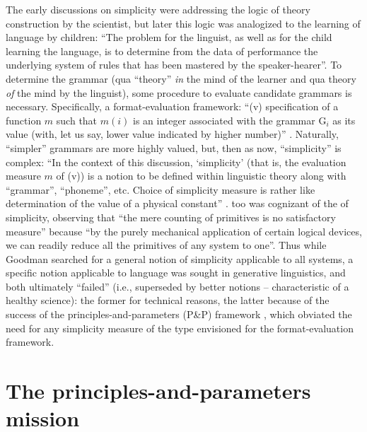 \documentclass[output=paper]{langsci/langscibook}
\begin{document}
The early discussions on simplicity were addressing the logic of theory
construction by the scientist, but later \citep[4]{Chomsky1965} this logic was
analogized to the learning of language by children: “The problem for the
linguist, as well as for the child learning the language, is to determine from
the data of performance the underlying system of rules that has been mastered
by the speaker-hearer”. To determine the grammar (qua “theory” \emph{in} the
mind of the learner and qua theory \emph{of} the mind by the linguist), some
procedure to evaluate candidate grammars is necessary. Specifically, a
format-evaluation framework: “(v) specification of a function $m$ such
that $m(i)$ is an integer associated with the grammar
$\text{G}_i$ as its value (with, let us say, lower value indicated
by higher number)” \parencite[31]{Chomsky1965}. Naturally, “simpler” grammars are more
highly valued, but, then as now, “simplicity” is complex: “In the context of
this discussion, ‘simplicity’ (that is, the evaluation measure $m$ of (v))
is a notion to be defined within linguistic theory along with \enquote{grammar},
\enquote{phoneme}, etc. Choice of simplicity measure is rather like determination of
the value of a physical constant” \parencite[37--38]{Chomsky1965}.
\citet[107--108]{Goodman1943} too was cognizant of the  of simplicity,
observing that “the mere counting of primitives is no satisfactory measure”
because “by the purely mechanical application of certain logical devices, we
can readily reduce all the primitives of any system to one”. Thus while Goodman
searched for a general notion of simplicity applicable to all systems, a
specific notion applicable to language was sought in generative linguistics,
and both ultimately “failed” (i.e., superseded by better notions -- characteristic
of a healthy science): the former for technical reasons, the latter because of
the success of the principles-and-parameters (P\&P) framework
\citep{Chomsky:81}, which obviated the need for any simplicity measure of the
type envisioned for the format-evaluation framework.

\section{The principles-and-parameters mission}
\end{document}
